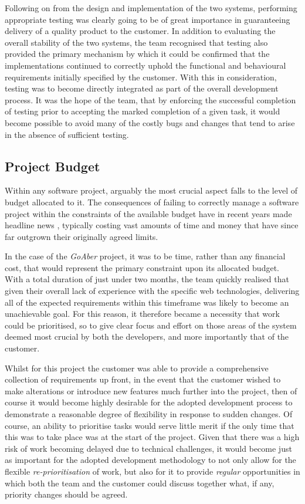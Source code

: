 Following on from the design and implementation of the two systems, performing appropriate testing was clearly going to be of great importance in guaranteeing delivery of a quality product to the customer. In addition to evaluating the overall stability of the two systems, the team recognised that testing also provided the primary mechanism by which it could be confirmed that the implementations continued to correctly uphold the functional and behavioural requirements initially specified by the customer. With this in consideration, testing was to become directly integrated as part of the overall development process. It was the hope of the team, that by enforcing the successful completion of testing prior to accepting the marked completion of a given task, it would become possible to avoid many of the costly bugs and changes that tend to arise in the absence of sufficient testing. 
 
 \subsection{Project Budget}

Within any software project, arguably the most crucial aspect falls to the level of budget allocated to it. The consequences of failing to correctly manage a software project within the constraints of the available budget have in recent years made headline news \cite{bbc-it}, typically costing vast amounts of time and money that have since far outgrown their originally agreed limits.

In the case of the \textit{GoAber} project, it was to be time, rather than any financial cost, that would represent the primary constraint upon its allocated budget. With a total duration of just under two months, the team quickly realised that given their overall lack of experience with the specific web technologies, delivering all of the expected requirements within this timeframe was likely to become an unachievable goal. For this reason, it therefore became a necessity that work could be prioritised, so to give clear focus and effort on those areas of the system deemed most crucial by both the developers, and more importantly that of the customer. 

 Whilst for this project the customer was able to provide a comprehensive collection of requirements up front, in the event that the customer wished to make alterations or introduce new features much further into the project, then of course it would become highly desirable for the adopted development process to demonstrate a reasonable degree of flexibility in response to sudden changes. Of course, an ability to prioritise tasks would serve little merit if the only time that this was to take place was at the start of the project. Given that there was a high risk of work becoming delayed due to technical challenges, it would become just as important for the adopted development methodology to not only allow for the flexible \textit{re-prioritisation} of work, but also for it to provide \textit{regular} opportunities in which both the team and the customer could discuss together what, if any, priority changes should be agreed.
 

